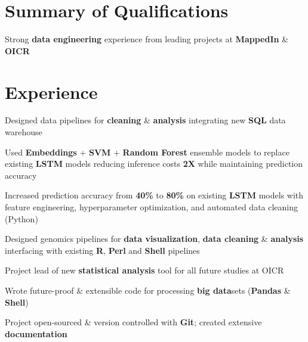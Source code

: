 \documentclass[]{chandan-cv}
\begin{document}
\begin{minipage}[t]{0.71\textwidth}


\section{Summary of Qualifications}
\runsubsection{ }
\descript{ }
\location{ }
\vspace{\topsep} %
\begin{tightemize}
	\item Strong \textbf{data engineering} experience from leading projects at \textbf{MappedIn} \& \textbf{OICR}
	\item 
	\item 
\end{tightemize}
\sectionsep


\section{Experience}

\begin{tightemize}
        \item Designed data pipelines for \textbf{cleaning} \& \textbf{analysis} integrating new \textbf{SQL} data warehouse
		\item Used \textbf{Embeddings} + \textbf{SVM} + \textbf{Random Forest} ensemble models to replace existing 
		\textbf{LSTM} models reducing inference costs \textbf{2X} while maintaining prediction accuracy
		\item Increased prediction accuracy from \textbf{40\%} to \textbf{80\%} on existing \textbf{LSTM} 
		models with feature engineering, hyperparameter optimization, and automated data cleaning (Python)
\end{tightemize}
\sectionsep

\begin{tightemize}
	\item Designed genomics pipelines for \textbf{data visualization}, \textbf{data cleaning} \& \textbf{analysis} interfacing with existing \textbf{R}, \textbf{Perl} and \textbf{Shell} pipelines
	\item Project lead of new \textbf{statistical analysis} tool for all future studies at OICR
	\item Wrote future-proof \& extensible code for processing \textbf{big data}sets (\textbf{Pandas} \& \textbf{Shell})
	\item Project open-sourced \& version controlled with \textbf{Git}; created extensive \textbf{documentation}
\end{tightemize}
\sectionsep


\end{minipage}
\end{document}
